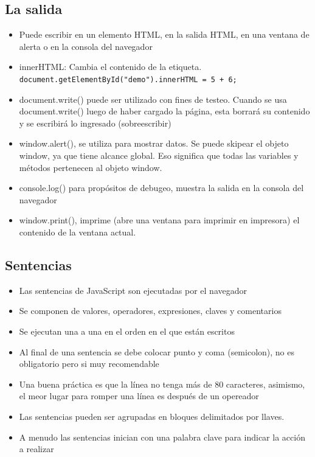 \documentclass{article}
\begin{document}
 \subsection{La salida}
 \begin{itemize}
   \item Puede escribir en un elemento HTML, en la salida HTML, en una ventana de alerta o en la consola del navegador
   \item innerHTML: Cambia el contenido de la etiqueta. \lstinline{document.getElementById("demo").innerHTML = 5 + 6;}
   \item document.write() puede ser utilizado con fines de testeo. Cuando se usa document.write() luego de haber cargado la página, esta borrará su contenido y se escribirá lo ingresado (sobreescribir)
   \item window.alert(), se utiliza para mostrar datos. Se puede skipear el objeto window, ya que tiene alcance global. Eso significa que todas las variables y métodos pertenecen al objeto window.
   \item console.log() para propósitos de debugeo, muestra la salida en la consola del navegador
   \item window.print(), imprime (abre una ventana para imprimir en impresora) el contenido de la ventana actual.
 \end{itemize}

 \subsection{Sentencias}

 \begin{itemize}
   \item  Las sentencias de JavaScript son ejecutadas por el navegador
   \item Se componen de valores, operadores, expresiones, claves y comentarios
   \item Se ejecutan una a una en el orden en el que están escritos
   \item Al final de una sentencia se debe colocar punto y coma (semicolon), no es obligatorio pero si muy recomendable
   \item Una buena práctica es que la línea no tenga más de 80 caracteres, asimismo, el meor lugar para romper una línea es después de un opereador
   \item Las sentencias pueden ser agrupadas en bloques delimitados por llaves.
   \item A menudo las sentencias inician con una palabra clave para indicar la acción a realizar
 \end{itemize}
\end{document}
